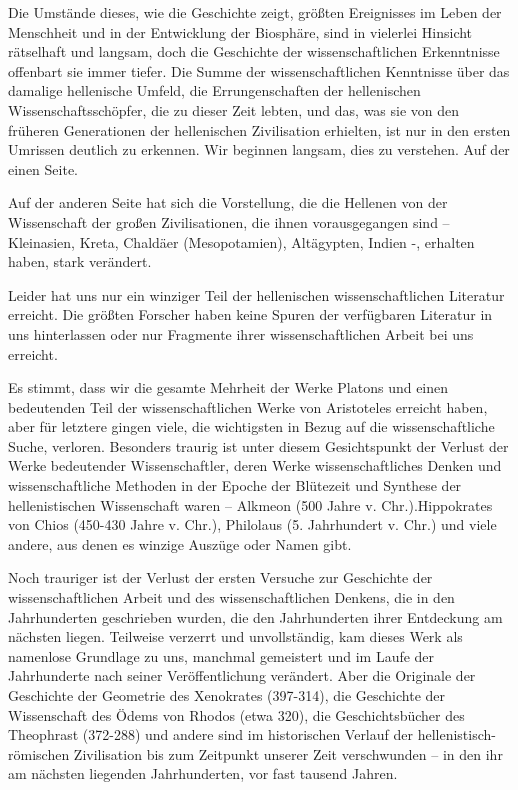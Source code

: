 \documentclass[11pt,a4paper]{book}
\begin{document}
Die Umstände dieses, wie die Geschichte zeigt, größten Ereignisses im Leben der Menschheit und in der Entwicklung der Biosphäre, sind in vielerlei Hinsicht rätselhaft und langsam, doch die Geschichte der wissenschaftlichen Erkenntnisse offenbart sie immer tiefer. Die Summe der wissenschaftlichen Kenntnisse über das damalige hellenische Umfeld, die Errungenschaften der hellenischen Wissenschaftsschöpfer, die zu dieser Zeit lebten, und das, was sie von den früheren Generationen der hellenischen Zivilisation erhielten, ist nur in den ersten Umrissen deutlich zu erkennen. Wir beginnen langsam, dies zu verstehen. Auf der einen Seite. 

Auf der anderen Seite hat sich die Vorstellung, die die Hellenen von der Wissenschaft der großen Zivilisationen, die ihnen vorausgegangen sind -- Kleinasien, Kreta, Chaldäer (Mesopotamien), Altägypten, Indien -, erhalten haben, stark verändert. 

Leider hat uns nur ein winziger Teil der hellenischen wissenschaftlichen Literatur erreicht. Die größten Forscher haben keine Spuren der verfügbaren Literatur in uns hinterlassen oder nur Fragmente ihrer wissenschaftlichen Arbeit bei uns erreicht. 

Es stimmt, dass wir die gesamte Mehrheit der Werke Platons und einen bedeutenden Teil der wissenschaftlichen Werke von Aristoteles erreicht haben, aber für letztere gingen viele, die wichtigsten in Bezug auf die wissenschaftliche Suche, verloren. Besonders traurig ist unter diesem Gesichtspunkt der Verlust der Werke bedeutender Wissenschaftler, deren Werke wissenschaftliches Denken und wissenschaftliche Methoden in der Epoche der Blütezeit und Synthese der hellenistischen Wissenschaft waren -- Alkmeon (500 Jahre v. Chr.).Hippokrates von Chios (450-430 Jahre v. Chr.), Philolaus (5. Jahrhundert v. Chr.) und viele andere, aus denen es winzige Auszüge oder Namen gibt. 

Noch trauriger ist der Verlust der ersten Versuche zur Geschichte der wissenschaftlichen Arbeit und des wissenschaftlichen Denkens, die in den Jahrhunderten geschrieben wurden, die den Jahrhunderten ihrer Entdeckung am nächsten liegen. Teilweise verzerrt und unvollständig, kam dieses Werk als namenlose Grundlage zu uns, manchmal gemeistert und im Laufe der Jahrhunderte nach seiner Veröffentlichung verändert. Aber die Originale der Geschichte der Geometrie des Xenokrates (397-314), die Geschichte der Wissenschaft des Ödems von Rhodos (etwa 320), die Geschichtsbücher des Theophrast (372-288) und andere sind im historischen Verlauf der hellenistisch-römischen Zivilisation bis zum Zeitpunkt unserer Zeit verschwunden -- in den ihr am nächsten liegenden Jahrhunderten, vor fast tausend Jahren. 
\end{document}
